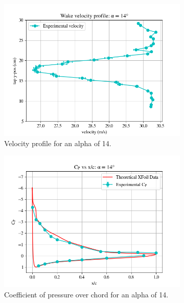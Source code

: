 \documentclass[11pt, letterpaper]{article}
\begin{document}
\begin{figure}[h]
  \begin{subfigure}{0.5\textwidth}
    \centering
    \includegraphics[width=1\linewidth]{Figures/vel-graphs/vel-a14.png}
    \caption{Velocity profile for an alpha of 14\degree.}
    \label{fig:vel-a14}
  \end{subfigure}%
  \begin{subfigure}{0.5\textwidth}
    \centering
    \includegraphics[width=1\textwidth]{Figures/C_p-a14.png}
    \caption{Coefficient of pressure over chord for an alpha of 14\degree.}
    \label{fig:C_p-a14}
  \end{subfigure}
\caption{}
  \label{fig:two3}
\end{figure}
\end{document}
